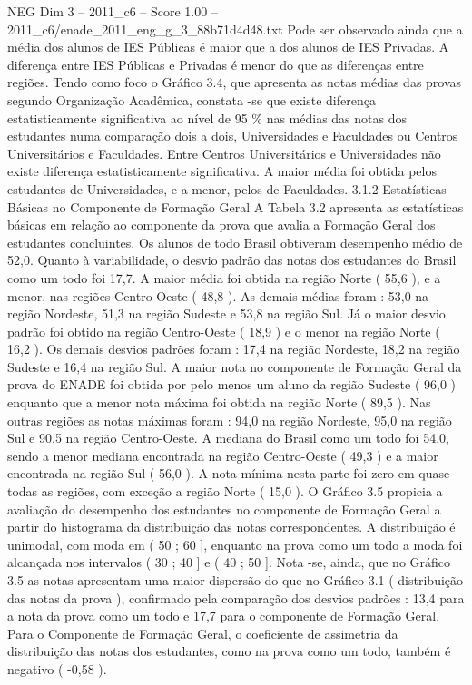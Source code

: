 \begin{textsample}{NEG Dim 3 – 2011\_c6 – Score 1.00 – 2011\_c6/enade\_2011\_eng\_g\_3\_88b71d4d48.txt}
Pode ser observado ainda que a média dos alunos de IES Públicas é maior que a dos alunos de IES Privadas.
A diferença entre IES Públicas e Privadas é menor do que as diferenças entre regiões.
Tendo como foco o Gráfico 3.4, que apresenta as notas médias das provas segundo Organização Acadêmica, constata -se que existe diferença estatisticamente significativa ao nível de 95 \% nas médias das notas dos estudantes numa comparação dois a dois, Universidades e Faculdades ou Centros Universitários e Faculdades.
Entre Centros Universitários e Universidades não existe diferença estatisticamente significativa.
A maior média foi obtida pelos estudantes de Universidades, e a menor, pelos de Faculdades. 3.1.2 Estatísticas Básicas no Componente de Formação Geral A Tabela 3.2 apresenta as estatísticas básicas em relação ao componente da prova que avalia a Formação Geral dos estudantes concluintes.
Os alunos de todo Brasil obtiveram desempenho médio de 52,0.
Quanto à variabilidade, o desvio padrão das notas dos estudantes do Brasil como um todo foi 17,7.
A maior média foi obtida na região Norte ( 55,6 ), e a menor, nas regiões Centro-Oeste ( 48,8 ).
As demais médias foram : 53,0 na região Nordeste, 51,3 na região Sudeste e 53,8 na região Sul.
Já o maior desvio padrão foi obtido na região Centro-Oeste ( 18,9 ) e o menor na região Norte ( 16,2 ).
Os demais desvios padrões foram : 17,4 na região Nordeste, 18,2 na região Sudeste e 16,4 na região Sul.
A maior nota no componente de Formação Geral da prova do ENADE foi obtida por pelo menos um aluno da região Sudeste ( 96,0 ) enquanto que a menor nota máxima foi obtida na região Norte ( 89,5 ).
Nas outras regiões as notas máximas foram : 94,0 na região Nordeste, 95,0 na região Sul e 90,5 na região Centro-Oeste.
A mediana do Brasil como um todo foi 54,0, sendo a menor mediana encontrada na região Centro-Oeste ( 49,3 ) e a maior encontrada na região Sul ( 56,0 ).
A nota mínima nesta parte foi zero em quase todas as regiões, com exceção a região Norte ( 15,0 ).
O Gráfico 3.5 propicia a avaliação do desempenho dos estudantes no componente de Formação Geral a partir do histograma da distribuição das notas correspondentes.
A distribuição é unimodal, com moda em ( 50 ; 60 ], enquanto na prova como um todo a moda foi alcançada nos intervalos ( 30 ; 40 ] e ( 40 ; 50 ].
Nota -se, ainda, que no Gráfico 3.5 as notas apresentam uma maior dispersão do que no Gráfico 3.1 ( distribuição das notas da prova ), confirmado pela comparação dos desvios padrões : 13,4 para a nota da prova como um todo e 17,7 para o componente de Formação Geral.
Para o Componente de Formação Geral, o coeficiente de assimetria da distribuição das notas dos estudantes, como na prova como um todo, também é negativo ( -0,58 ).

\end{textsample}
